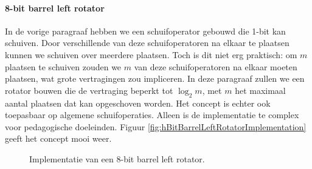 \paragraph{8-bit barrel left rotator}
In de vorige paragraaf hebben we een schuifoperator gebouwd die 1-bit kan schuiven. Door verschillende van deze schuifoperatoren na elkaar te plaatsen kunnen we schuiven over meerdere plaatsen. Toch is dit niet erg praktisch: om $m$ plaatsen te schuiven zouden we $m$ van deze schuifoperatoren na elkaar moeten plaatsen, wat grote vertragingen zou impliceren. In deze paragraaf zullen we een rotator bouwen die de vertraging beperkt tot $\log_2 m$, met $m$ het maximaal aantal plaatsen dat kan opgeschoven worden. Het concept is echter ook toepasbaar op algemene schuifoperaties. Alleen is de implementatie te complex voor pedagogische doeleinden. Figuur \ref{fig:hBitBarrelLeftRotatorImplementation} geeft het concept mooi weer.
\begin{figure}[hbt]
\centering
{}
\caption{Implementatie van een 8-bit barrel left rotator.}
\end{figure}
